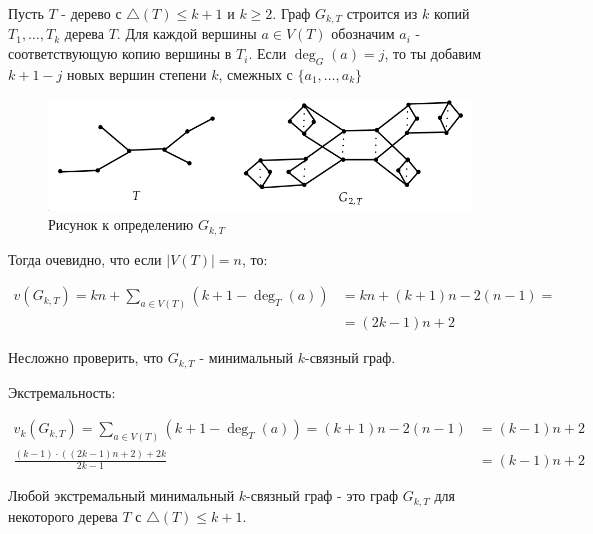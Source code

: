\begin{df*}[$G_{k,T}$]
	Пусть $T$ - дерево с  $\triangle(T) \leqslant k + 1$ и $k \geqslant 2$.
	Граф $G_{k, T}$ строится из  $k$ копий  $T_1, \ldots, T_k$ дерева $T$.
	Для каждой вершины  $a \in V(T)$ обозначим  $a_i$ - соответствующую копию вершины в $T_i$.
	Если  $\deg_G(a) = j$, то ты добавим  $k + 1 - j$ новых вершин степени  $k$, смежных с  $\{a_1, \ldots, a_k\}$

\begin{figure}[ht]
    \centering
	\includegraphics[width=0.5\columnwidth]{figures/3_definition_g_k_t.png}
    \caption{Рисунок к определению $G_{k, T}$}
\end{figure}

	Тогда очевидно, что если $|V(T)| = n$, то:

	\begin{align*}
		v(G_{k, T}) = kn + \sum_{a \in V(T)} (k + 1 - \deg_T(a)) &= kn + (k + 1)n - 2 (n - 1) =\\
																&=(2k - 1)n + 2
	\end{align*}

	Несложно проверить, что  $G_{k, T}$ - минимальный $k$-связный граф. 

	Экстремальность:

	\begin{align*}
		v_k(G_{k, T}) = \sum_{a \in V(T)} (k + 1 - \deg_T(a)) = (k + 1)n - 2(n - 1) &= (k - 1)n + 2 \\
		\frac{(k - 1) \cdot ((2k - 1)n + 2) + 2k}{2k - 1} &= (k - 1) n + 2
	\end{align*}


\end{df*}

\begin{customthm}{3.2} \label{theorem:3_2}
	Любой экстремальный минимальный $k$-связный граф - это граф  $G_{k, T}$ для некоторого дерева  $T$ с  $\triangle(T) \leqslant k + 1$.
\end{customthm}


